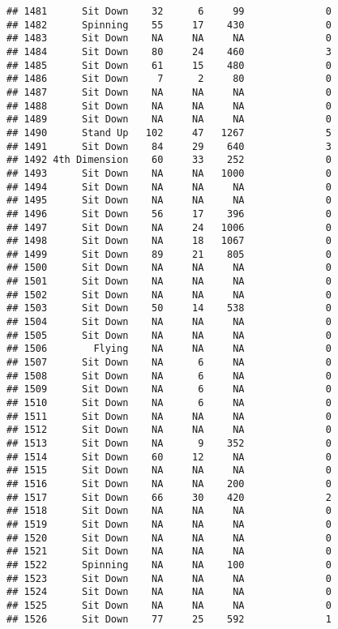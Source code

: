 \documentclass[
]{article}
\begin{document}
\begin{verbatim}
## 1481      Sit Down    32      6     99              0
## 1482      Spinning    55     17    430              0
## 1483      Sit Down    NA     NA     NA              0
## 1484      Sit Down    80     24    460              3
## 1485      Sit Down    61     15    480              0
## 1486      Sit Down     7      2     80              0
## 1487      Sit Down    NA     NA     NA              0
## 1488      Sit Down    NA     NA     NA              0
## 1489      Sit Down    NA     NA     NA              0
## 1490      Stand Up   102     47   1267              5
## 1491      Sit Down    84     29    640              3
## 1492 4th Dimension    60     33    252              0
## 1493      Sit Down    NA     NA   1000              0
## 1494      Sit Down    NA     NA     NA              0
## 1495      Sit Down    NA     NA     NA              0
## 1496      Sit Down    56     17    396              0
## 1497      Sit Down    NA     24   1006              0
## 1498      Sit Down    NA     18   1067              0
## 1499      Sit Down    89     21    805              0
## 1500      Sit Down    NA     NA     NA              0
## 1501      Sit Down    NA     NA     NA              0
## 1502      Sit Down    NA     NA     NA              0
## 1503      Sit Down    50     14    538              0
## 1504      Sit Down    NA     NA     NA              0
## 1505      Sit Down    NA     NA     NA              0
## 1506        Flying    NA     NA     NA              0
## 1507      Sit Down    NA      6     NA              0
## 1508      Sit Down    NA      6     NA              0
## 1509      Sit Down    NA      6     NA              0
## 1510      Sit Down    NA      6     NA              0
## 1511      Sit Down    NA     NA     NA              0
## 1512      Sit Down    NA     NA     NA              0
## 1513      Sit Down    NA      9    352              0
## 1514      Sit Down    60     12     NA              0
## 1515      Sit Down    NA     NA     NA              0
## 1516      Sit Down    NA     NA    200              0
## 1517      Sit Down    66     30    420              2
## 1518      Sit Down    NA     NA     NA              0
## 1519      Sit Down    NA     NA     NA              0
## 1520      Sit Down    NA     NA     NA              0
## 1521      Sit Down    NA     NA     NA              0
## 1522      Spinning    NA     NA    100              0
## 1523      Sit Down    NA     NA     NA              0
## 1524      Sit Down    NA     NA     NA              0
## 1525      Sit Down    NA     NA     NA              0
## 1526      Sit Down    77     25    592              1

\end{verbatim}
\end{document}
